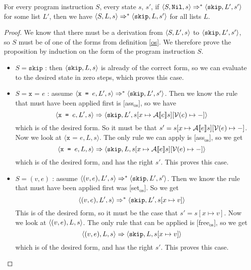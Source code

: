 \begin{proposition}
For every program instruction $S$, every state $s$, $s'$, if $\langle S, \texttt{Nil}, s \rangle \Rightarrow ^{*} \langle \texttt{skip}, L', s' \rangle$ for some list $L'$, then we have $\langle S, L, s \rangle \Rightarrow ^{*} \langle \texttt{skip}, L, s' \rangle$ for all lists $L$. 
\end{proposition}

\begin{proof}
We know that there must be a derivation from $\langle S, L', s \rangle$ to $\langle \texttt{skip}, L', s' \rangle$, so $S$ must be of one of the forms from definition \ref{os}. We therefore prove the proposition by induction on the form of the program instruction $S$.

\begin{itemize}[noitemsep]
    \item $S = \texttt{skip}$ : then $\langle \texttt{skip}, L, s \rangle$ is already of the correct form, so we can evaluate to the desired state in zero steps, which proves this case. 
    
    \item $S = \texttt{x = } e$ : assume $\langle \texttt{x = } e, L', s \rangle \Rightarrow ^{*} \langle \texttt{skip}, L', s' \rangle$. Then we know the rule that must have been applied first is [ass$_{\textrm{os}}$], so we have 
    $$\langle \texttt{x = } e, L', s \rangle \Rightarrow \langle \texttt{skip}, L', s[x \mapsto \mathcal{A} \llbracket e \rrbracket s][\mathcal{V}(e)\mapsto-] \rangle$$
    which is of the desired form. So it must be that $s' = s[x \mapsto \mathcal{A} \llbracket e \rrbracket s][\mathcal{V}(e)\mapsto-]$. Now we look at $\langle \texttt{x = } e, L, s \rangle$. The only rule we can apply is [ass$_{\textrm{os}}$], so we get 
    $$\langle \texttt{x = } e, L, s \rangle \Rightarrow \langle \texttt{skip}, L, s [x \mapsto \mathcal{A} \llbracket e \rrbracket s][\mathcal{V}(e)\mapsto-] \rangle$$
    which is of the desired form, and has the right $s'$. This proves this case. 
    
    \item $S = (v,e)$ : assume $\langle (v,e), L', s \rangle \Rightarrow ^{*} \langle \texttt{skip}, L', s' \rangle$. Then we know the rule that must have been applied first was [set$_{\textrm{os}}$]. So we get
    $$\langle (v,e), L', s \rangle \Rightarrow ^{*} \langle \texttt{skip}, L', s[x\mapsto v] \rangle$$ 
    This is of the desired form, so it must be the case that $s' = s[x\mapsto v]$. Now we look at $\langle (v,e), L, s \rangle$. The only rule that can be applied is [free$_{\textrm{os}}$], so we get $$\langle (v,e), L, s \rangle \Rightarrow  \langle \texttt{skip}, L, s[x\mapsto v] \rangle$$
    which is of the desired form, and has the right $s'$. This proves this case.
    

\end{itemize}
\end{proof}
